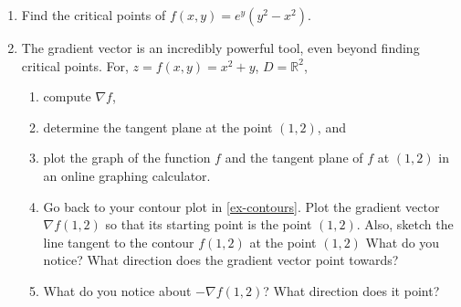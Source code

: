 \documentclass[12pt]{amsart}
\newcommand{\R}{\mathbb{R}}
\theoremstyle{definition}
\newtheorem*{definition}{Definition}
\begin{document}
\begin{enumerate}[itemsep=2.5em,leftmargin=0pt]
\vspace{2.5em}

\begin{definition}
    The gradient vector of a differentiable function $f(x_1,x_2,\ldots,x_n)$ is the vector-valued function
    \[
        \nabla f = \langle f_{x_1}, f_{x_2}, \ldots, f_{x_n} \rangle
    \]
\end{definition}

\begin{definition}
    The \textbf{critical points} of a multivariable function are the points where the gradient vector of the function is the $0$-vector $\mathbf{0}$ or undefined.
\end{definition}

\noindent \textbf{Note.} There are special rules for classifying critical points which involve partial derivatives. We won't mention them here because most of the functions we'll encounter will be so complicated that it would be nearly impossible to find and classify all of their critical points.

\vspace{-2em}

\item Find the critical points of $f(x,y)=e^y(y^2-x^2)$.


\item The gradient vector is an incredibly powerful tool, even beyond finding critical points. For, $z=f(x,y)=x^2+y$, $D=\R^2$, 
\begin{enumerate}
    \item compute $\nabla f$,
    \item determine the tangent plane at the point $(1,2)$, and
    \item plot the graph of the function $f$ and the tangent plane of $f$ at $(1,2)$ in an online graphing calculator.
    \item Go back to your contour plot in \ref{ex-contours}. Plot the gradient vector $\nabla f(1,2)$ so that its starting point is the point $(1,2)$. Also, sketch the line tangent to the contour $f(1,2)$ at the point $(1,2)$ What do you notice? What direction does the gradient vector point towards?
    \item What do you notice about $-\nabla f(1,2)$? What direction does it point?
\end{enumerate}


\end{enumerate}
\end{document}
